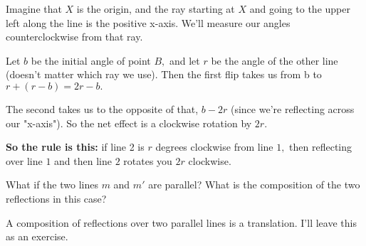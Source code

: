 Imagine that $X$ is the origin, and the ray starting at $X$ and going to the upper left along the line is the positive x-axis.  We'll measure our angles counterclockwise from that ray.

Let $b$ be the initial angle of point $B,$ and let $r$ be the angle of the other line (doesn't matter which ray we use).  Then the first flip takes us from b to $r + (r-b) = 2r-b.$

The second takes us to the opposite of that, $b-2r$ (since we're reflecting across our "x-axis").  So the net effect is a clockwise rotation by $2r.$

\textbf{So the rule is this:} if line 2 is $r$ degrees clockwise from line $1,$ then reflecting over line $1$ and then line $2$ rotates you $2r$ clockwise.

What if the two lines $m$ and $m'$ are parallel? What is the composition of the two reflections in this case?












A composition of reflections over two parallel lines is a translation. I'll leave this as an exercise.

